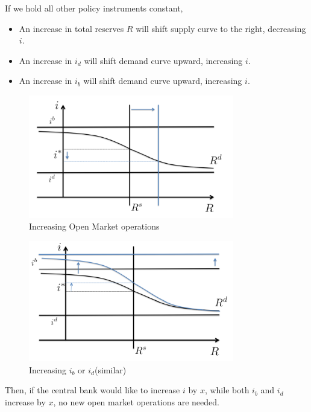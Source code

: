 If we hold all other policy instruments constant,
\begin{itemize}
    \item An increase in total reserves $R$ will shift supply curve to the right, decreasing $i$.
    \item An increase in $i_d$ will shift demand curve upward, increasing $i$.
    \item An increase in $i_b$ will shift demand curve upward, increasing $i$.
\end{itemize}

\begin{figure}[!htbp]
    \centering
    \includegraphics[width=0.8\textwidth]{figures/PS(3).png}
    \caption{Increasing Open Market operations}
\end{figure}

\begin{figure}
    \centering
    \includegraphics[width=0.8\textwidth]{figures/PS(3)-2.png}
    \caption{Increasing $i_b$ or $i_d$(similar)}
\end{figure}

Then, if the central bank would like to increase $i$ by $x$, while both $i_b$ and $i_d$ increase by $x$,
no new open market operations are needed.

